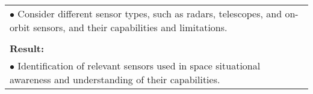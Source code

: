 \begin{table}[!h]
\begin{center}
\begin{tabular}{|p{35mm}||p{55mm}|p{50mm}||p{40mm}|}
      \multicolumn{4}{|p{150mm}|}{$\bullet$ Consider different sensor types, such as radars, telescopes, and on-orbit sensors, and their capabilities and limitations.} \\
      \multicolumn{4}{|p{150mm}|}{}                                                                                                                                                                           \\
      \multicolumn{4}{|p{150mm}|}{\textbf{Result:}}                                                                                                                                                       \\
      \multicolumn{4}{|p{150mm}|}{$\bullet$  Identification of relevant sensors used in space situational awareness and understanding of their capabilities.}                                                                                                                          \\
      \hline
    \end{tabular}
  \end{center}
\end{table}

\clearpage


